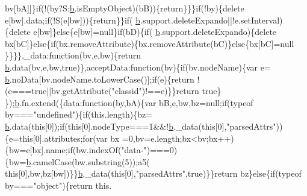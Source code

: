 \begin{DoxyCode}
      bv[bA]]\}\textcolor{keywordflow}{if}(!(by?S:\hyperlink{jquery_8js_aa4026ad5544b958e54ce5e106fa1c805}{b}.isEmptyObject)(bB))\{\textcolor{keywordflow}{return}\}\}\}\textcolor{keywordflow}{if}(!by)\{\textcolor{keyword}{delete} e[bw].data;\textcolor{keywordflow}{if}(!S(e[bw]))\{\textcolor{keywordflow}{return}\}\}\textcolor{keywordflow}{if}(
      \hyperlink{jquery_8js_aa4026ad5544b958e54ce5e106fa1c805}{b}.support.deleteExpando||!e.setInterval)\{\textcolor{keyword}{delete} e[bw]\}\textcolor{keywordflow}{else}\{e[bw]=null\}\textcolor{keywordflow}{if}(bD)\{\textcolor{keywordflow}{if}(
      \hyperlink{jquery_8js_aa4026ad5544b958e54ce5e106fa1c805}{b}.support.deleteExpando)\{\textcolor{keyword}{delete} bx[bC]\}\textcolor{keywordflow}{else}\{\textcolor{keywordflow}{if}(bx.removeAttribute)\{bx.removeAttribute(bC)\}\textcolor{keywordflow}{else}\{bx[bC]=null
      \}\}\}\},\_data:\textcolor{keyword}{function}(bv,e,bw)\{\textcolor{keywordflow}{return} \hyperlink{jquery_8js_aa4026ad5544b958e54ce5e106fa1c805}{b}.data(bv,e,bw,\textcolor{keyword}{true})\},acceptData:\textcolor{keyword}{function}(bv)\{\textcolor{keywordflow}{if}(bv.nodeName)\{var e=
      \hyperlink{jquery_8js_aa4026ad5544b958e54ce5e106fa1c805}{b}.noData[bv.nodeName.toLowerCase()];\textcolor{keywordflow}{if}(e)\{\textcolor{keywordflow}{return} !(e===\textcolor{keyword}{true}||bv.getAttribute(\textcolor{stringliteral}{"classid"})!==e)\}\}\textcolor{keywordflow}{return} \textcolor{keyword}{true}\}
      \});\hyperlink{jquery_8js_aa4026ad5544b958e54ce5e106fa1c805}{b}.fn.extend(\{data:\textcolor{keyword}{function}(by,bA)\{var bB,e,bw,bz=null;\textcolor{keywordflow}{if}(typeof by===\textcolor{stringliteral}{"undefined"})\{\textcolor{keywordflow}{if}(this.length)\{bz=
      \hyperlink{jquery_8js_aa4026ad5544b958e54ce5e106fa1c805}{b}.data(\textcolor{keyword}{this}[0]);\textcolor{keywordflow}{if}(\textcolor{keyword}{this}[0].nodeType===1&&!\hyperlink{jquery_8js_aa4026ad5544b958e54ce5e106fa1c805}{b}.\_data(\textcolor{keyword}{this}[0],\textcolor{stringliteral}{"parsedAttrs"}))\{e=\textcolor{keyword}{this}[0].attributes;\textcolor{keywordflow}{for}(var bx
      =0,bv=e.length;bx<bv;bx++)\{bw=e[bx].name;\textcolor{keywordflow}{if}(bw.indexOf(\textcolor{stringliteral}{"data-"})===0)\{bw=\hyperlink{jquery_8js_aa4026ad5544b958e54ce5e106fa1c805}{b}.camelCase(bw.substring(5));a5(\textcolor{keyword}{
      this}[0],bw,bz[bw])\}\}\hyperlink{jquery_8js_aa4026ad5544b958e54ce5e106fa1c805}{b}.\_data(\textcolor{keyword}{this}[0],\textcolor{stringliteral}{"parsedAttrs"},\textcolor{keyword}{true})\}\}\textcolor{keywordflow}{return} bz\}\textcolor{keywordflow}{else}\{\textcolor{keywordflow}{if}(typeof by===\textcolor{stringliteral}{"object"})\{\textcolor{keywordflow}{return} this.

\end{DoxyCode}
